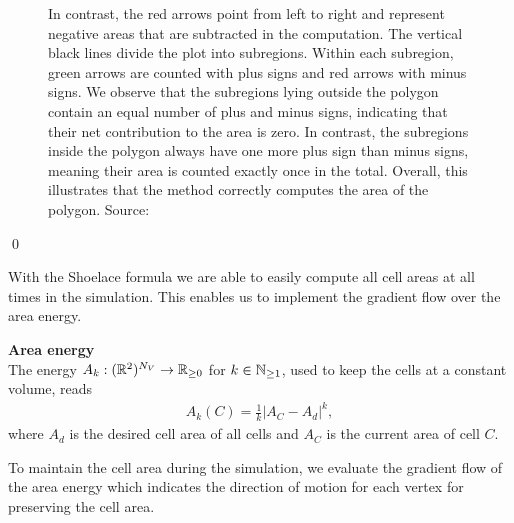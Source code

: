 \begin{proposition}
\begin{figure}
\begin{center}
{				In contrast, the red arrows point from left to right and represent negative areas that are subtracted in the computation.
				The vertical black lines divide the plot into subregions.
				Within each subregion, green arrows are counted with plus signs and red arrows with minus signs.
				We observe that the subregions lying outside the polygon contain an equal number of plus and minus signs, indicating that their net contribution to the area is zero.
				In contrast, the subregions inside the polygon always have one more plus sign than minus signs, meaning their area is counted exactly once in the total.
				Overall, this illustrates that the method correctly computes the area of the polygon.
				Source:~\cite{ShoelaceFigure2022}}
			\label{fig:shoelace}
		\end{center}
	\end{figure}
	\qed
\end{proposition}

With the Shoelace formula we are able to easily compute all cell areas at all times in the simulation. 
This enables us to implement the gradient flow over the area energy. 

\begin{definition} \textbf{Area energy} \\
The energy $A_k: (\mathbb{R}^2)^{N_V} \rightarrow \mathbb{R}_{\geq 0}$ for $k \in \mathbb{N}_{\geq 1}$, used to keep the cells at a constant volume, reads 
	\begin{align}
		A_k(C) = \frac{1}{k} |A_{C} - A_d|^k, \label{eq:areaEnergy} 
	\end{align}
	where $A_d$ is the desired cell area of all cells and $A_{C}$ is the current area of cell $C$. 
\end{definition}

To maintain the cell area during the simulation, we evaluate the gradient flow of the area energy which indicates the direction of motion for each vertex for preserving the cell area.

